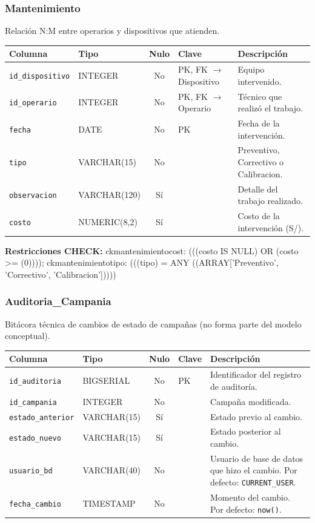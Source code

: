 \documentclass[11pt,letterpaper]{article}
\newcommand{\tbus}{\textunderscore\allowbreak}
\newcommand{\tb}[1]{{\ttfamily\let\_\tbus #1}}
\begin{document}
\subsubsection*{Mantenimiento}
Relación N:M entre operarios y dispositivos que atienden.
{\footnotesize
\begin{longtable}{>{\raggedright\arraybackslash}p{3.3cm}>{\raggedright\arraybackslash}p{2.5cm}c>{\raggedright\arraybackslash}p{2.2cm}>{\raggedright\arraybackslash}p{6.1cm}}
\toprule
\textbf{Columna} & \textbf{Tipo} & \textbf{Nulo} & \textbf{Clave} & \textbf{Descripción} \\
\midrule
\endhead
\texttt{id\_dispositivo} & INTEGER & No & PK, FK $\to$ Dispositivo & Equipo intervenido. \\
\texttt{id\_operario} & INTEGER & No & PK, FK $\to$ Operario & Técnico que realizó el trabajo. \\
\texttt{fecha} & DATE & No & PK & Fecha de la intervención. \\
\texttt{tipo} & VARCHAR(15) & No &  & Preventivo, Correctivo o Calibracion. \\
\texttt{observacion} & VARCHAR(120) & Sí &  & Detalle del trabajo realizado. \\
\texttt{costo} & NUMERIC(8,2) & Sí &  & Costo de la intervención (S/). \\
\bottomrule
\end{longtable}}
{\footnotesize\textbf{Restricciones CHECK:} \tb{ck\_mantenimiento\_cost}: \tb{(((costo IS NULL) OR (costo >= (0))))}; \tb{ck\_mantenimiento\_tipo}: \tb{(((tipo) = ANY ((ARRAY['Preventivo', 'Correctivo', 'Calibracion']))))}\par}
\medskip
\subsubsection*{Auditoria\_Campania}
Bitácora técnica de cambios de estado de campañas (no forma parte del modelo conceptual).
{\footnotesize
\begin{longtable}{>{\raggedright\arraybackslash}p{3.3cm}>{\raggedright\arraybackslash}p{2.5cm}c>{\raggedright\arraybackslash}p{2.2cm}>{\raggedright\arraybackslash}p{6.1cm}}
\toprule
\textbf{Columna} & \textbf{Tipo} & \textbf{Nulo} & \textbf{Clave} & \textbf{Descripción} \\
\midrule
\endhead
\texttt{id\_auditoria} & BIGSERIAL & No & PK & Identificador del registro de auditoría. \\
\texttt{id\_campania} & INTEGER & No &  & Campaña modificada. \\
\texttt{estado\_anterior} & VARCHAR(15) & Sí &  & Estado previo al cambio. \\
\texttt{estado\_nuevo} & VARCHAR(15) & Sí &  & Estado posterior al cambio. \\
\texttt{usuario\_bd} & VARCHAR(40) & No &  & Usuario de base de datos que hizo el cambio. Por defecto: \texttt{CURRENT\_USER}. \\
\texttt{fecha\_cambio} & TIMESTAMP & No &  & Momento del cambio. Por defecto: \texttt{now()}. \\
\bottomrule
\end{longtable}}
\end{document}
